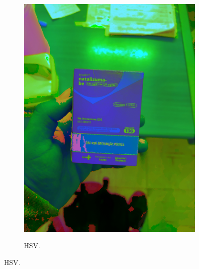 \begin{figure}[htb]
\begin{subfigure}[t]{0.22\textwidth}
        \includegraphics[width=\linewidth]{../pictures/tysabri_HLS.jpg}
    \end{subfigure}
    \hfill
    \begin{subfigure}[t]{0.22\textwidth}
        \centering
        \caption{HSV.}

\end{subfigure}
\end{figure}
